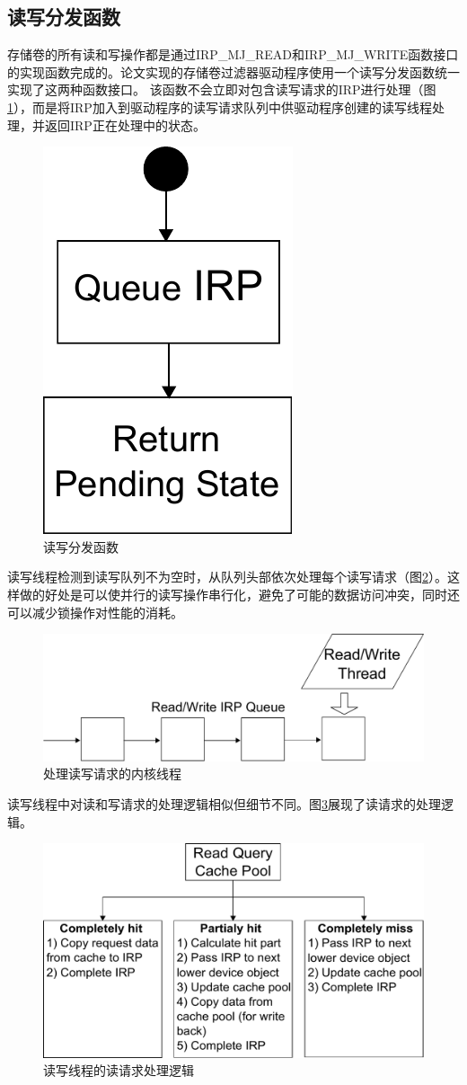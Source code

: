 \subsection{读写分发函数}

存储卷的所有读和写操作都是通过IRP\_MJ\_READ和IRP\_MJ\_WRITE函数接口的实现函数完成的。论文实现的存储卷过滤器驱动程序使用一个读写分发函数统一实现了这两种函数接口。
该函数不会立即对包含读写请求的IRP进行处理（图\ref{fig:df-rw}），而是将IRP加入到驱动程序的读写请求队列中供驱动程序创建的读写线程处理，并返回IRP正在处理中的状态。

\begin{figure}[H]
\centering
\includegraphics[width=0.2\linewidth]{./graph/df-rw}
\caption{读写分发函数}
\label{fig:df-rw}
\end{figure}

读写线程检测到读写队列不为空时，从队列头部依次处理每个读写请求（图\ref{fig:df-rw-thread}）。这样做的好处是可以使并行的读写操作串行化，避免了可能的数据访问冲突，同时还可以减少锁操作对性能的消耗。

\begin{figure}[H]
\centering
\includegraphics[width=0.75\linewidth]{./graph/df-rw-thread}
\caption{处理读写请求的内核线程}
\label{fig:df-rw-thread}
\end{figure}

读写线程中对读和写请求的处理逻辑相似但细节不同。图\ref{fig:df-proc-read}展现了读请求的处理逻辑。

\begin{figure}[H]
\centering
\includegraphics[width=0.8\linewidth]{./graph/df-proc-read}
\caption{读写线程的读请求处理逻辑}
\label{fig:df-proc-read}
\end{figure}

